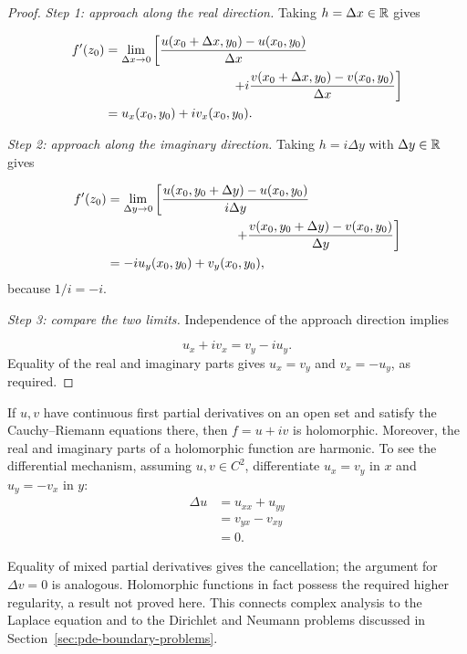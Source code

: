 \begin{proof}
\textit{Step 1: approach along the real direction.} Taking $h=\Delta x\in\mathbb{R}$ gives

\begin{align}
f'(z_0)
&=\lim_{\Delta x\to0}\left[
\frac{u(x_0+\Delta x,y_0)-u(x_0,y_0)}{\Delta x}\right.\notag\\
&\hspace{35mm}\left.+i\frac{v(x_0+\Delta x,y_0)-v(x_0,y_0)}{\Delta x}\right]\notag\\
&=u_x(x_0,y_0)+iv_x(x_0,y_0).
\end{align}

\textit{Step 2: approach along the imaginary direction.} Taking $h=i\Delta y$ with $\Delta y\in\mathbb{R}$ gives

\begin{align}
f'(z_0)
&=\lim_{\Delta y\to0}\left[
\frac{u(x_0,y_0+\Delta y)-u(x_0,y_0)}{i\Delta y}\right.\notag\\
&\hspace{35mm}\left.+\frac{v(x_0,y_0+\Delta y)-v(x_0,y_0)}{\Delta y}\right]\notag\\
&=-iu_y(x_0,y_0)+v_y(x_0,y_0),
\end{align}
because $1/i=-i$.

\textit{Step 3: compare the two limits.} Independence of the approach direction implies

\[
u_x+iv_x=v_y-iu_y.
\]
Equality of the real and imaginary parts gives $u_x=v_y$ and $v_x=-u_y$, as required.
\end{proof}

\begin{remark}
If $u,v$ have continuous first partial derivatives on an open set and satisfy the Cauchy--Riemann equations there, then $f=u+iv$ is holomorphic. Moreover, the real and imaginary parts of a holomorphic function are harmonic. To see the differential mechanism, assuming $u,v\in C^2$, differentiate $u_x=v_y$ in $x$ and $u_y=-v_x$ in $y$:
\[
\begin{aligned}
\Delta u &= u_{xx}+u_{yy} \\
&= v_{yx}-v_{xy} \\
&= 0.
\end{aligned}
\]

Equality of mixed partial derivatives gives the cancellation; the argument for $\Delta v=0$ is analogous. Holomorphic functions in fact possess the required higher regularity, a result not proved here. This connects complex analysis to the Laplace equation and to the Dirichlet and Neumann problems discussed in Section~\ref{sec:pde-boundary-problems}.
\end{remark}

